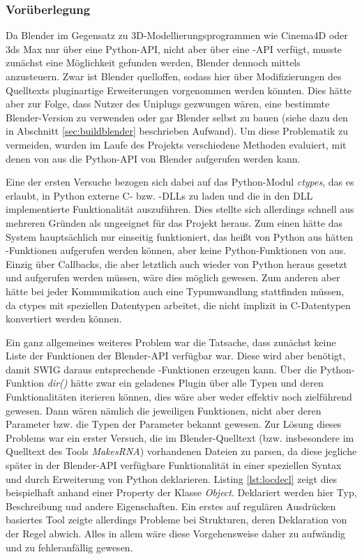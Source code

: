 \label{sec:header}

\subsubsection{Vorüberlegung}

Da Blender im Gegensatz zu 3D-Modellierungsprogrammen wie Cinema4D oder 3ds Max nur über eine Python-API, nicht aber über eine \CC-API verfügt, musste zunächst eine Möglichkeit gefunden werden, Blender dennoch mittels \CC{} anzusteuern. Zwar ist Blender quelloffen, sodass hier über Modifizierungen des Quelltexts pluginartige Erweiterungen vorgenommen werden könnten. Dies hätte aber zur Folge, dass Nutzer des Uniplugs gezwungen wären, eine bestimmte Blender-Version zu verwenden oder gar Blender selbst zu bauen (siehe dazu den in Abschnitt \ref{sec:buildblender} beschrieben Aufwand). Um diese Problematik zu vermeiden, wurden im Laufe des Projekts verschiedene Methoden evaluiert, mit denen von \CC aus die Python-API von Blender aufgerufen werden kann.

Eine der ersten Versuche bezogen sich dabei auf das Python-Modul \emph{ctypes}, das es erlaubt, in Python externe C- bzw. \CC-DLLs zu laden und die in den DLL implementierte Funktionalität auszuführen. Dies stellte sich allerdings schnell aus mehreren Gründen als ungeeignet für das Projekt heraus. Zum einen hätte das System hauptsächlich nur einseitig funktioniert, das heißt von Python aus hätten \CC-Funktionen aufgerufen werden können, aber keine Python-Funktionen von \CC{} aus. Einzig über Callbacks, die aber letztlich auch wieder von Python heraus gesetzt und aufgerufen werden müssen, wäre dies möglich gewesen. Zum anderen aber hätte bei jeder Kommunikation auch eine Typumwandlung stattfinden müssen, da ctypes mit speziellen Datentypen arbeitet, die nicht implizit in C-Datentypen konvertiert werden können.

Ein ganz allgemeines weiteres Problem war die Tatsache, dass zunächst keine Liste der Funktionen der Blender-API verfügbar war. Diese wird aber benötigt, damit SWIG daraus entsprechende \CS-Funktionen erzeugen kann. Über die Python-Funktion \emph{dir()} hätte zwar ein geladenes Plugin über alle Typen und deren Funktionalitäten iterieren können, dies wäre aber weder effektiv noch zielführend gewesen. Dann wären nämlich die jeweiligen Funktionen, nicht aber deren Parameter bzw. die Typen der Parameter bekannt gewesen. Zur Lösung dieses Problems war ein erster Versuch, die im Blender-Quelltext (bzw. insbesondere im Quelltext des Tools \emph{MakesRNA}) vorhandenen Dateien zu parsen, da diese jegliche später in der Blender-API verfügbare Funktionalität in einer speziellen Syntax und durch Erweiterung von Python deklarieren. Listing \ref{lst:locdecl} zeigt dies beispielhaft anhand einer Property der Klasse \emph{Object}. Deklariert werden hier Typ, Beschreibung und andere Eigenschaften. Ein erstes auf regulären Ausdrücken basiertes Tool zeigte allerdings Probleme bei Strukturen, deren Deklaration von der Regel abwich. Alles in allem wäre diese Vorgehensweise daher zu aufwändig und zu fehleranfällig gewesen.

